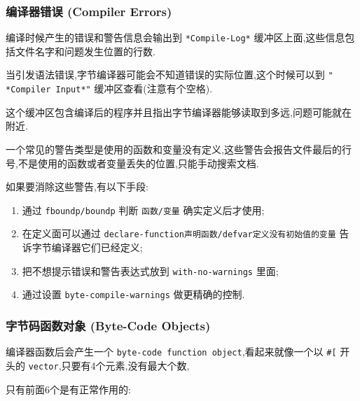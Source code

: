 \documentclass[11pt]{article}
\begin{document}
\subsubsection{编译器错误 (Compiler Errors)}
\label{sec:org64f9dea}

编译时候产生的错误和警告信息会输出到 \texttt{*Compile-Log*} 缓冲区上面,这些信息包括文件名字和问题发生位置的行数.

当引发语法错误,字节编译器可能会不知道错误的实际位置,这个时候可以到 \texttt{" *Compiler Input*"} 缓冲区查看(注意有个空格).

这个缓冲区包含编译后的程序并且指出字节编译器能够读取到多远,问题可能就在附近.

一个常见的警告类型是使用的函数和变量没有定义,这些警告会报告文件最后的行号,不是使用的函数或者变量丢失的位置,只能手动搜索文档.

如果要消除这些警告,有以下手段:

\begin{enumerate}
\item 通过 \texttt{fboundp/boundp} 判断 \texttt{函数/变量} 确实定义后才使用;

\item 在定义面可以通过 \texttt{declare-function声明函数/defvar定义没有初始值的变量} 告诉字节编译器它们已经定义;

\item 把不想提示错误和警告表达式放到 \texttt{with-no-warnings} 里面;

\item 通过设置 \texttt{byte-compile-warnings} 做更精确的控制.
\end{enumerate}


\subsubsection{字节码函数对象 (Byte-Code Objects)}
\label{sec:orgdd14129}

编译器函数后会产生一个 \texttt{byte-code function object},看起来就像一个以 \texttt{\#[} 开头的 \texttt{vector},只要有4个元素,没有最大个数,

只有前面6个是有正常作用的:
\end{document}

